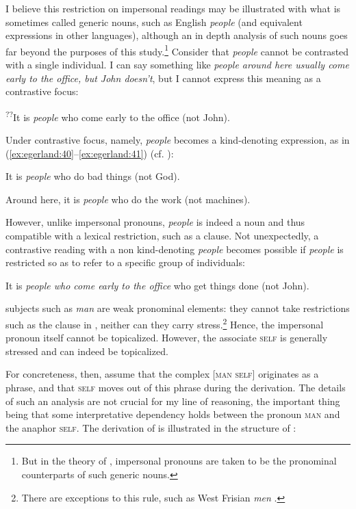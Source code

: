 \documentclass[output=paper]{LSP/langsci}
\begin{document}
I believe this restriction on impersonal readings may be illustrated with what is sometimes called generic nouns, such as English \textit{people} (and equivalent expressions in other languages), although an in depth analysis of such nouns goes far beyond the purposes of this study.\footnote{But in the theory of \citet{Hoekstra2010}, impersonal pronouns are taken to be the pronominal counterparts of such generic nouns.} Consider that \textit{people} cannot be contrasted with a single individual. I can say something like \textit{people around here usually come early to the office, but John doesn’t}, but I cannot express this meaning as a contrastive focus:

\ea\label{ex:egerland:39}
\textsuperscript{??}It is \textit{people} who come early to the office (not John).
\z

Under contrastive focus, namely, \textit{people} becomes a kind-denoting expression, as in (\ref{ex:egerland:40}--\ref{ex:egerland:41}) (cf. \citealt{Chierchia1998}):

\ea\label{ex:egerland:40}
It is \textit{people} who do bad things (not God).
\z

\ea\label{ex:egerland:41}
Around here, it is \textit{people} who do the work (not machines).
\z

However, unlike impersonal pronouns, \textit{people} is indeed a noun and thus compatible with a lexical restriction, such as a  clause. Not unexpectedly, a contrastive reading with a non kind-denoting \textit{people} becomes possible if \textit{people} is restricted so as to refer to a specific group of individuals:

\ea\label{ex:egerland:42}
It is \textit{people who come early to the office} who get things done (not John).
\z


 subjects such as \textit{man} are weak pronominal elements: they cannot take restrictions such as the  clause in , neither can they carry stress.\footnote{There are exceptions to this rule, such as West Frisian \textit{men} \citep{Hoekstra2010}.} Hence, the impersonal pronoun itself cannot be topicalized. However, the associate \textsc{self} is generally stressed and can indeed be topicalized.

For concreteness, then, assume that the complex [\textsc{man self}] originates as a phrase, and that \textsc{self} moves out of this phrase during the derivation. The details of such an analysis are not crucial for my line of reasoning, the important thing being that some interpretative dependency holds between the pronoun \textsc{man} and the anaphor \textsc{self}. The derivation of  is illustrated in the structure of :
\end{document}

